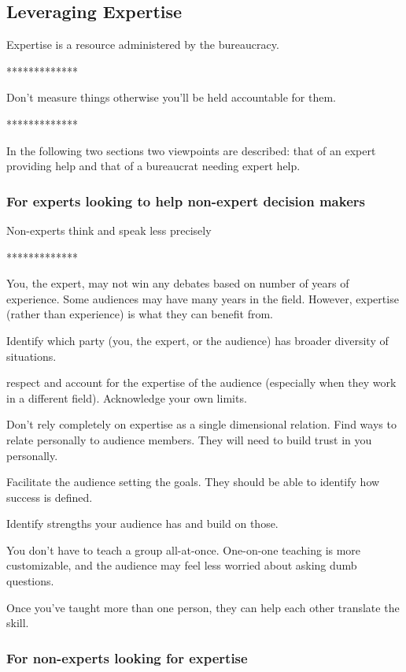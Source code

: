 \subsection{Leveraging Expertise\label{sec:expertise}}

Expertise is a resource administered by the bureaucracy.

*************

Don't measure things otherwise you'll be held accountable for them.

*************

In the following two sections two viewpoints are described: that of an expert providing help and that of a bureaucrat needing expert help. 

\subsubsection{For experts looking to help non-expert decision makers}

Non-experts think and speak less precisely

*************

You, the expert, may not win any debates based on number of years of experience. Some audiences may have many years in the field. However, expertise (rather than experience) is what they can benefit from. 

Identify which party (you, the expert, or the audience) has broader diversity of situations.

respect and account for the expertise of the audience (especially when they work in a different field). Acknowledge your own limits.

Don't rely completely on expertise as a single dimensional relation. Find ways to relate personally to audience members. They will need to build trust in you personally.

Facilitate the audience setting the goals. They should be able to identify how success is defined.

Identify strengths your audience has and build on those.

You don't have to teach a group all-at-once. One-on-one teaching is more customizable, and the audience may feel less worried about asking dumb questions.

Once you've taught more than one person, they can help each other translate the skill. 


\subsubsection{For non-experts looking for expertise}

